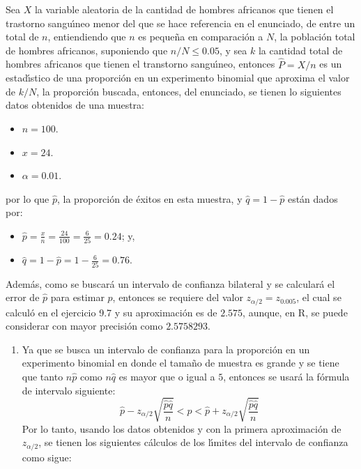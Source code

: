 \begin{solucion}
 Sea $X$ la variable aleatoria de la cantidad de hombres africanos que tienen el trastorno sangu\'{\i}neo menor del que se hace referencia en el enunciado, de entre un total de $n$, entiendiendo que $n$ es peque\~na en comparaci\'on a $N$, la poblaci\'on total de hombres africanos, suponiendo que $n/N \leq 0.05$, y sea $k$ la cantidad total de hombres africanos que tienen el transtorno sangu\'{\i}neo, entonces $\widehat{P} = X/n$ es un estad\'{\i}stico de una proporci\'on en un experimento binomial que aproxima el valor de $k/N$, la proporci\'on buscada, entonces, del enunciado, se tienen lo siguientes datos obtenidos de una muestra:
 \begin{itemize}
  \item $n = 100$.
  \item $x = 24$.
  \item $\alpha = 0.01$.
 \end{itemize}
 por lo que $\hat{p}$, la proporci\'on de \'exitos en esta muestra, y $\hat{q} = 1 - \hat{p}$ est\'an dados por:
 \begin{itemize}
  \item $\hat{p} = \frac{x}{n} = \frac{24}{100} = \frac{6}{25} = 0.24$; y,
  \item $\hat{q} = 1 - \hat{p} = 1 - \frac{6}{25} = 0.76$.
 \end{itemize}
 Adem\'as, como se buscar\'a un intervalo de confianza bilateral y se calcular\'a el error de $\hat{p}$ para estimar $p$, entonces se requiere del valor $z_{\alpha/2} = z_{0.005}$, el cual se calcul\'o en el ejercicio 9.7 y su aproximaci\'on es de $2.575$, aunque, en R, se puede considerar con mayor precisi\'on como $2.5758293$.
 \begin{enumerate}
  \item Ya que se busca un intervalo de confianza para la proporci\'on en un experimento binomial en donde el tama\~no de muestra es grande y se tiene que tanto $n\hat{p}$ como $n\hat{q}$ es mayor que o igual a $5$, entonces se usar\'a la f\'ormula de intervalo siguiente:
  \begin{equation*}
   \hat{p} - z_{\alpha/2}\sqrt{\frac{\hat{p}\hat{q}}{n}} < p < \hat{p} + z_{\alpha/2}\sqrt{\frac{\hat{p}\hat{q}}{n}}
  \end{equation*}
  Por lo tanto, usando los datos obtenidos y con la primera aproximaci\'on de $z_{\alpha/2}$, se tienen los siguientes c\'alculos de los l\'{\i}mites del intervalo de confianza como sigue:
  \begin{eqnarray*}

\end{eqnarray*}
\end{enumerate}
\end{solucion}
